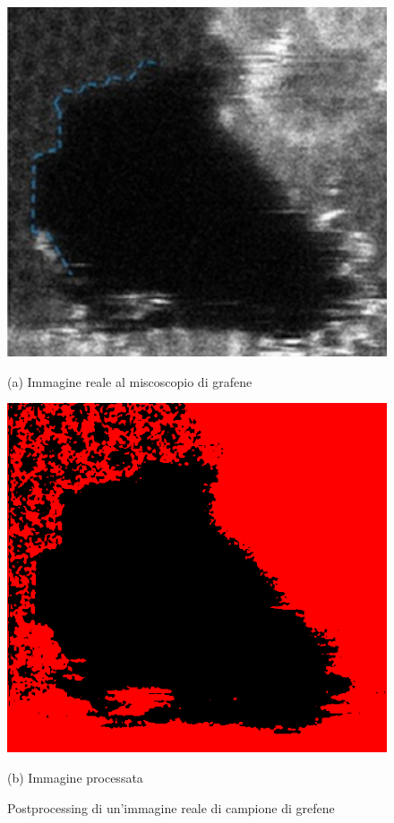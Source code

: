 \documentclass[12pt,a4paper,openright,twoside]{report}
\begin{document}
\begin{figure}[h]
\begin{minipage}[t]{0.49\linewidth}
\centering
\includegraphics[width=\linewidth]{graphene_real_1.png}

(a) Immagine reale al miscoscopio di grafene 
\end{minipage}%
\hfill\vrule\hfill
\begin{minipage}[t]{0.49\linewidth}
\centering
\includegraphics[width=\linewidth]{graphene_real_1_red.png}

(b) Immagine processata 
\end{minipage}
\caption{Postprocessing di un'immagine reale di campione di grefene}
\end{figure}
\end{document}
